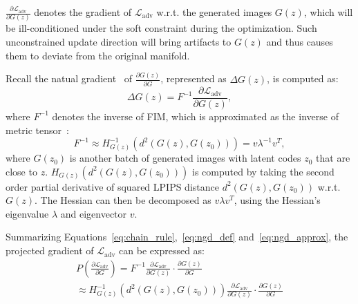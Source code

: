 $\frac{\partial \mathcal{L}_{\text{adv}}}{\partial G(z)}$ denotes the gradient of $\mathcal{L}_{\text{adv}}$ w.r.t. the generated images $G(z)$, which will be ill-conditioned under the soft constraint during the optimization.
Such unconstrained update direction will bring artifacts to $G(z)$ and thus causes them to deviate from the original manifold.

Recall the natual gradient~\cite{ngd} of $\frac{\partial G(z)}{\partial G}$, represented as $\Delta G(z)$, is computed as:
\begin{equation}
	\Delta G(z) = F^{-1} \frac{\partial \mathcal{L}_{\text{adv}}}{\partial G(z)},
	\label{eq:ngd_def}
\end{equation}
where $F^{-1}$ denotes the inverse of FIM, which is approximated as the inverse of metric tensor~\cite{rogan18cvpr}:
\begin{equation}
	F^{-1} \approx H^{-1}_{G(z)}(d^2(G(z),G(z_0)))
	\label{eq:ngd_approx} = v\lambda^{-1}v^T,
\end{equation}
where $G(z_0)$ is another batch of generated images with latent codes $z_0$ that are close to $z$. $H_{G(z)}(d^2(G(z),G(z_0)))$ is computed by taking the second order partial derivative of squared LPIPS distance $d^2(G(z),G(z_0))$ w.r.t. $G(z)$. The Hessian can then be decomposed as $v\lambda v^T$, using the Hessian's eigenvalue $\lambda$ and eigenvector $v$.

Summarizing Equations~\ref{eq:chain_rule},~\ref{eq:ngd_def} and~\ref{eq:ngd_approx}, the projected gradient of $\mathcal{L}_{\text{adv}}$ can be expressed as:
\begin{equation}
\begin{split}
	P(\frac{\partial \mathcal{L}_{\text{adv}}}{\partial G})=F^{-1} \frac{\partial \mathcal{L}_{\text{adv}}}{\partial G(z)} \cdot \frac{\partial G(z)}{\partial G} \\
	\approx H^{-1}_{G(z)}(d^2(G(z),G(z_0))) \frac{\partial \mathcal{L}_{\text{adv}}}{\partial G(z)} \cdot \frac{\partial G(z)}{\partial G}
\end{split}
\end{equation}

